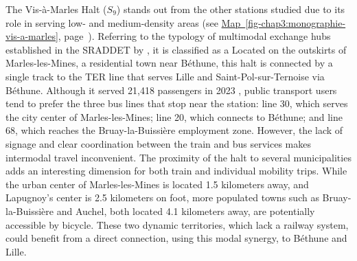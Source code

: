 \begin{refsegment}
The Vis-à-Marles Halt (\(S_9\)) stands out from the other stations studied due to its role in serving low- and medium-density areas (see \hyperref[fig-chap3:monographie-vis-a-marles]{Map~\ref{fig-chap3:monographie-vis-a-marles}}, page~\pageref{fig-chap3:monographie-vis-a-marles}). Referring to the typology of multimodal exchange hubs established in the \acrshort{SRADDET} by \textcolor{blue}{\textcite[82]{region_hauts-de-france_sraddet_2024}}, it is classified as a  Located on the outskirts of Marles-les-Mines, a residential town near Béthune, this halt is connected by a single track to the \acrshort{TER} line that serves Lille and Saint-Pol-sur-Ternoise via Béthune. Although it served 21,418 passengers in 2023 \textcolor{blue}{\autocite{sncf_frequentation_2024}}, public transport users tend to prefer the three bus lines that stop near the station: line 30, which serves the city center of Marles-les-Mines; line 20, which connects to Béthune; and line 68, which reaches the Bruay-la-Buissière employment zone. However, the lack of signage and clear coordination between the train and bus services makes intermodal travel inconvenient. The proximity of the halt to several municipalities adds an interesting dimension for both train and individual mobility trips. While the urban center of Marles-les-Mines is located 1.5 kilometers away, and Lapugnoy's center is 2.5 kilometers on foot, more populated towns such as Bruay-la-Buissière and Auchel, both located 4.1 kilometers away, are potentially accessible by bicycle. These two dynamic territories, which lack a railway system, could benefit from a direct connection, using this modal synergy, to Béthune and Lille.%



\end{refsegment}
